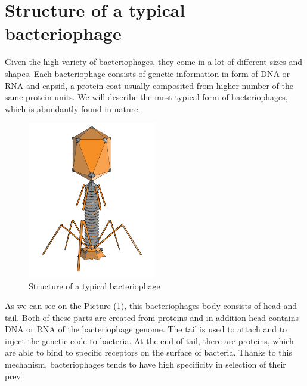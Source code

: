 \section{Structure of a typical bacteriophage}
Given the high variety of bacteriophages, they come in a lot of different sizes and shapes.
Each bacteriophage consists of genetic information in form of DNA or RNA and capsid, a protein coat usually composited from higher number of the same protein units.
We will describe the most typical form of bacteriophages, which is abundantly found in nature.

\begin{figure}[h]
\includegraphics[width=0.5\textwidth]{./images/phage.png}
\centering
\caption{Structure of a typical bacteriophage 
}
\label{fig:phage}
\end{figure}


As we can see on the Picture (\ref{fig:phage}), this bacteriophages body consists of head and tail.
Both of these parts are created from proteins and in addition head contains DNA or RNA of the bacteriophage genome.
The tail is used to attach and to inject the genetic code to bacteria.
At the end of tail, there are proteins, which are able to bind to specific receptors on the surface of bacteria.
Thanks to this mechanism, bacteriophages tends to have high specificity in selection of their prey.

